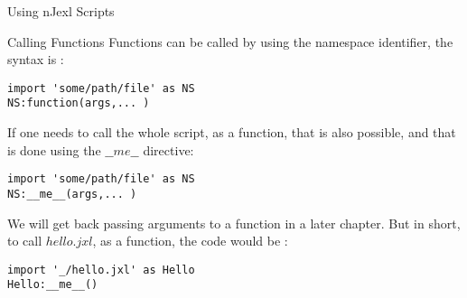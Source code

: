 \begin{section}{Using nJexl Scripts}
\begin{subsection}{Calling Functions}
Functions can be called by using the namespace identifier, the syntax is :

\begin{lstlisting}[style=JexlStyle]
import 'some/path/file' as NS
NS:function(args,... ) 
\end{lstlisting}

If one needs to call the whole script, as a function, 
that is also possible, and that is done using the $\_\_me\_\_$ directive:

\begin{lstlisting}[style=JexlStyle]
import 'some/path/file' as NS
NS:__me__(args,... ) 
\end{lstlisting}
We will get back passing arguments to a function in a later chapter.
But in short, to call $hello.jxl$, as a function, the code would be :

\begin{lstlisting}[style=JexlStyle]
import '_/hello.jxl' as Hello
Hello:__me__() 
\end{lstlisting}

\end{subsection}


\end{section}

